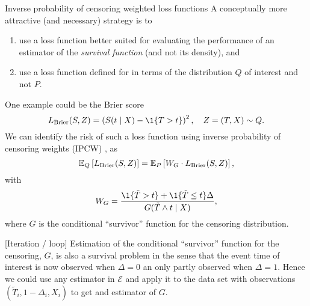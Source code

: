 \documentclass[smaller]{beamer}\usepackage{listings}
\begin{document}
\begin{frame}[label={sec:org7e19160}]{Inverse probability of censoring weighted loss functions}
\small A conceptually more attractive (and necessary) strategy is to
\begin{enumerate}[{(i)}]
\item use a loss function better suited for evaluating the performance of an estimator of the \emph{survival
function} (and not its density), and
\item use a loss function defined for in terms of the distribution \(Q\) of interest and not \(P\).
\end{enumerate}

One example could be the Brier score
\begin{equation*}
  L_{\mathrm{Brier}}(S, Z) = 
  \left(
    S(t \mid X) - \1
    {\left\{
        T > t
      \right\}}
  \right)^2,
  \quad Z = (T, X) \sim Q.
\end{equation*}
We can identify the risk of such a loss function using inverse probability of censoring weights
(IPCW) \citep{graf1999assessment,gerds2006consistent,van2003unicv}, as
\begin{equation*}
  \operatorname{\mathbb{E}}_Q\left[ L_{\mathrm{Brier}}(S, Z) \right]
  = \operatorname{\mathbb{E}}_P\left[W_G \cdot L_{\mathrm{Brier}}(S, Z) \right],
\end{equation*}
with
\begin{equation*}
  W_G = \frac{\1{\{\tilde T > t\}} + \1{\{\tilde T \leq t\}}\Delta}{G(\tilde T \wedge t \mid X)},
\end{equation*}
where \(G\) is the conditional ``survivor'' function for the censoring distribution. 
\end{frame}


\begin{frame}[label={sec:orgc12e12a}]{[Iteration / loop]}
Estimation of the conditional ``survivor'' function for the censoring, \(G\), is also a survival
problem in the sense that the event time of interest is now observed when \(\Delta =0\) an only
partly observed when \(\Delta =1\). Hence we could use any estimator in \(\mathcal{E}\) and apply it
to the data set with observations \((\tilde T_i, 1-\Delta_i, X_i)\) to get and estimator of \(G\).

\def\shift{3}
\def\ls{}
\def\lw{.5mm}
\begin{center}
\end{center}
\end{frame}
\end{document}

